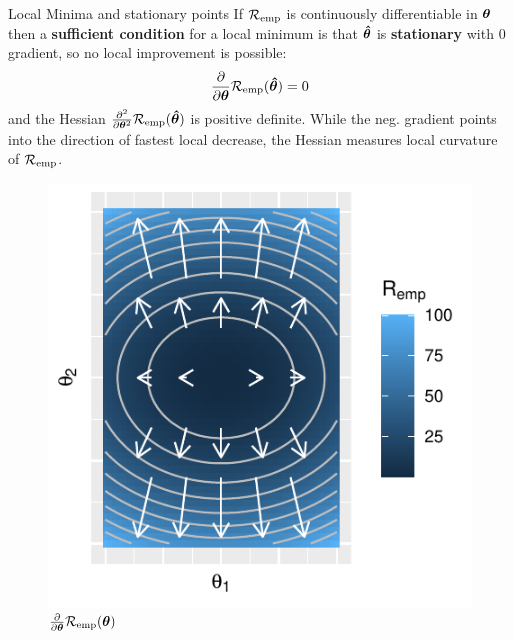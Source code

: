 \documentclass[11pt,compress,t,notes=noshow, xcolor=table]{beamer}
\begin{document}
\begin{vbframe}{Local Minima and stationary points}
\footnotesize
If $\mathcal{R}_{\text{emp}}$ is continuously differentiable in $\bm{\theta}$ then a \textbf{sufficient condition} for a local minimum is that $\bm{\hat\theta}$ is \textbf{stationary} with 0 gradient, so no local improvement is possible:
\[
\frac{\partial}{\partial\bm{\theta}}\mathcal{R}_{\text{emp}}(\bm{\hat\theta}) = 0
\]
and the Hessian $\frac{\partial^2}{\partial\bm{\theta}^2}\mathcal{R}_{\text{emp}}(\bm{\hat\theta})$ is positive definite. While the neg. gradient points into the direction of fastest local decrease, the Hessian measures local curvature of $\mathcal{R}_{\text{emp}}$.

\begin{figure}[!htb]
  \includegraphics[width=\linewidth]{figure/grad}
  \caption*{\footnotesize$\frac{\partial}{\partial\bm{\theta}}\mathcal{R}_{\text{emp}}(\bm{\theta})$}
\endminipage\hfill
{}

\end{figure}
\end{vbframe}
\end{document}
